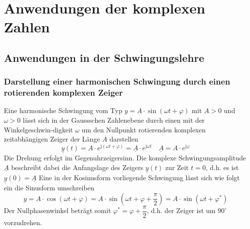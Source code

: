 \chapter{Anwendungen der komplexen Zahlen}
\section{Anwendungen in der Schwingungslehre}
\subsection{Darstellung einer harmonischen Schwingung durch einen rotierenden komplexen Zeiger}
Eine harmonische Schwingung vom Typ $y=A\cdot\sin\left(\omega t+\varphi\right)$ mit $A>0$ und $\omega>0$ lässt sich in der Gaussschen Zahlenebene durch einen mit der Winkelgeschwin-digkeit $\omega$ um den Nullpunkt rotierenden komplexen zeitabhängigen Zeiger der Länge $A$ darstellen
\begin{equation}
\boxed{\underline{y}\left(t\right)=A\cdot e^{\text{j}\left(\omega t+\varphi\right)}=\underline{A}\cdot e^{\text{j}\omega t}}\quad \boxed{\underline{A}=A\cdot e^{\text{j}\varphi}}
\end{equation}
Die Drehung erfolgt im Gegenuhrzeigersinn. Die komplexe Schwingungsamplitude $\underline{A}$ beschreibt dabei die Anfangslage des Zeigers $\underline{y}\left(t\right)$ zur Zeit $t=0$, d.h. es ist $\underline{y}\left(0\right)=\underline{A}$
\newline\newline
Eine in der Kosinusform vorliegende Schwingung lässt sich wie folgt ein die Sinusform umschreiben
\begin{equation}
\boxed{y=A\cdot \cos\left(\omega t+\varphi\right)=A\cdot \sin\left(\omega t+\varphi+\dfrac{\pi}{2}\right)=A\cdot \sin\left(\omega t+\varphi^*\right)}
\end{equation}
Der Nullphasenwinkel beträgt somit $\varphi^*=\varphi+\dfrac{\pi}{2}$, d.h. der Zeiger ist um $90^{\circ}$ vorzudrehen.
